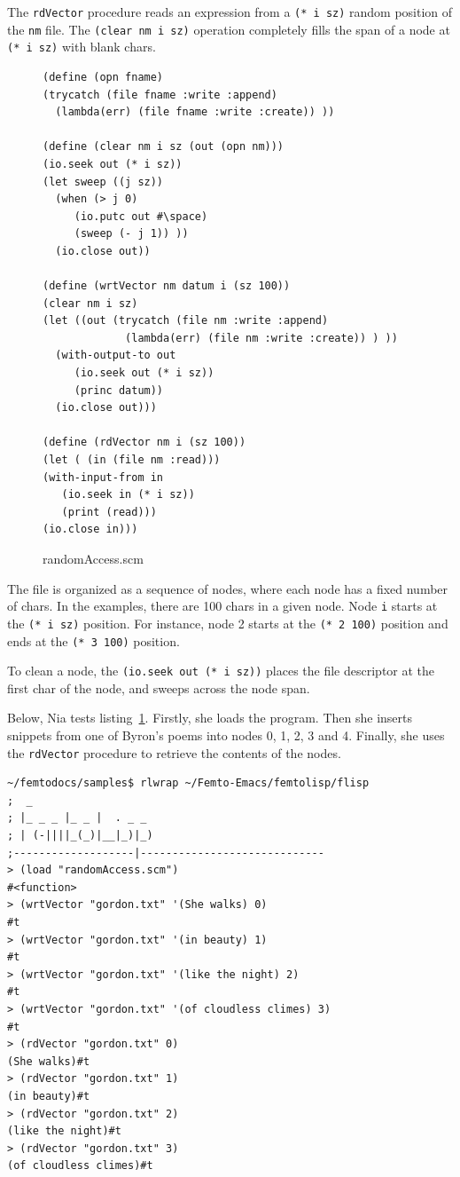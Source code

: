 \documentclass[a4paper,12pt]{book}
\newenvironment{fmpage}[1]
           {\begin{lrbox}{\fmbox}\begin{minipage}{#1}}
           {\end{minipage}\end{lrbox}\fbox{\usebox{\fmbox}}}
\begin{document}
The \verb|rdVector| procedure reads
an expression from a \verb|(* i sz)|
random position of the \verb|nm| file.
The \verb|(clear nm i sz)| operation
completely fills the span of 
a node at \verb|(* i sz)| with
blank chars.

\begin{figure}[!h]
\begin{fmpage}{0.95\textwidth}
\begin{verbatim}
(define (opn fname)
(trycatch (file fname :write :append)
  (lambda(err) (file fname :write :create)) ))

(define (clear nm i sz (out (opn nm)))
(io.seek out (* i sz))
(let sweep ((j sz))
  (when (> j 0)
     (io.putc out #\space)
     (sweep (- j 1)) ))
  (io.close out))

(define (wrtVector nm datum i (sz 100))
(clear nm i sz)
(let ((out (trycatch (file nm :write :append)
             (lambda(err) (file nm :write :create)) ) ))
  (with-output-to out
     (io.seek out (* i sz))
     (princ datum))
  (io.close out)))

(define (rdVector nm i (sz 100))
(let ( (in (file nm :read)))
(with-input-from in
   (io.seek in (* i sz))
   (print (read)))
(io.close in)))
\end{verbatim}
\end{fmpage}
\caption{randomAccess.scm}
\label{randomAccess}
\end{figure}

The file is organized as a sequence
of nodes, where each node has a fixed
number of chars. In the examples,
there are 100 chars in a given node.
Node \verb|i| starts at the 
\verb|(* i sz)| position. For instance,
node 2 starts at the \verb|(* 2 100)|
position and ends at the \verb|(* 3 100)|
position.

To clean a node, the \verb|(io.seek out (* i sz))|
places the file descriptor at the first char
of the node, and sweeps across the node span.



Below, Nia tests   
listing~\ref{randomAccess}. 
Firstly, she loads the 
program. Then she inserts
snippets from one of Byron's
poems into nodes 0, 1, 2, 3 and 4.
Finally, she uses the \verb|rdVector|
procedure to retrieve the contents
of the nodes.


\begin{verbatim}
~/femtodocs/samples$ rlwrap ~/Femto-Emacs/femtolisp/flisp
;  _
; |_ _ _ |_ _ |  . _ _
; | (-||||_(_)|__|_)|_)
;-------------------|-----------------------------
> (load "randomAccess.scm")
#<function>
> (wrtVector "gordon.txt" '(She walks) 0)
#t
> (wrtVector "gordon.txt" '(in beauty) 1)
#t
> (wrtVector "gordon.txt" '(like the night) 2)
#t
> (wrtVector "gordon.txt" '(of cloudless climes) 3)
#t
> (rdVector "gordon.txt" 0)
(She walks)#t
> (rdVector "gordon.txt" 1)
(in beauty)#t
> (rdVector "gordon.txt" 2)
(like the night)#t
> (rdVector "gordon.txt" 3)
(of cloudless climes)#t
\end{verbatim}
\end{document}
